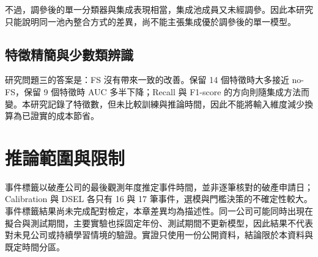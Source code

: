 不過，調參後的單一分類器與集成表現相當，集成池成員又未經調參。因此本研究只能說明同一池內整合方式的差異，尚不能主張集成優於調參後的單一模型。

\subsection{特徵精簡與少數類辨識}

研究問題三的答案是：FS 沒有帶來一致的改善。保留 14 個特徵時大多接近 no-FS，保留 9 個特徵時 AUC 多半下降；Recall 與 F1-score 的方向則隨集成方法而變。本研究記錄了特徵數，但未比較訓練與推論時間，因此不能將輸入維度減少換算為已證實的成本節省。

\section{推論範圍與限制}

事件標籤以破產公司的最後觀測年度推定事件時間，並非逐筆核對的破產申請日；Calibration 與 DSEL 各只有 16 與 17 筆事件，選模與門檻決策的不確定性較大。事件標籤結果尚未完成配對檢定，本章差異均為描述性。同一公司可能同時出現在擬合與測試期間，主要實驗也採固定年份、測試期間不更新模型，因此結果不代表對未見公司或持續學習情境的驗證。實證只使用一份公開資料，結論限於本資料與既定時間分區。
\endgroup
